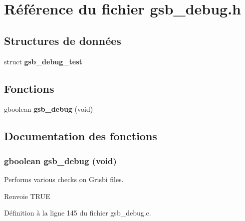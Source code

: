 \section{Référence du fichier gsb\_\-debug.h}
\label{gsb__debug_8h}
\subsection*{Structures de données}
\begin{DoxyCompactItemize}
\item 
struct {\bf gsb\_\-debug\_\-test}
\end{DoxyCompactItemize}
\subsection*{Fonctions}
\begin{DoxyCompactItemize}
\item 
gboolean {\bf gsb\_\-debug} (void)
\end{DoxyCompactItemize}


\subsection{Documentation des fonctions}
\subsubsection[{gsb\_\-debug}]{\setlength{\rightskip}{0pt plus 5cm}gboolean gsb\_\-debug (void)}\label{gsb__debug_8h_a0f8015596839d99fcbdf93c38bc8cf34}
Performs various checks on Grisbi files.

\begin{DoxyReturn}{Renvoie}
TRUE 
\end{DoxyReturn}


Définition à la ligne 145 du fichier gsb\_\-debug.c.

